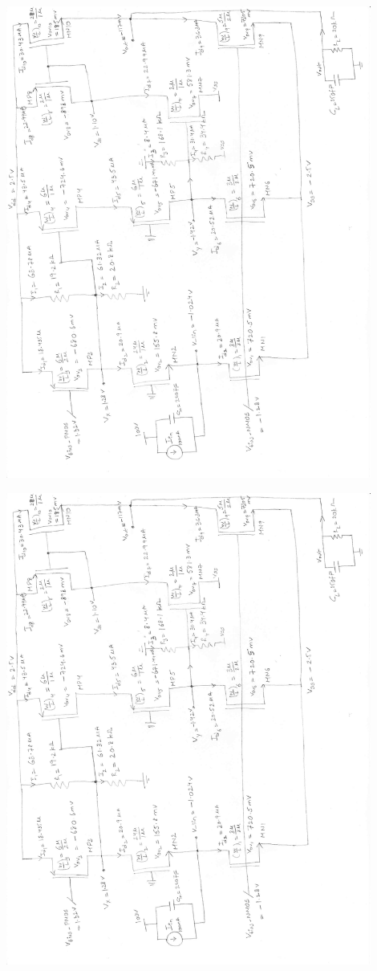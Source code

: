 \documentclass[12pt,a4paper]{article}
\begin{document}
{\centering
	\includegraphics[page=1, angle=270, width=0.9\textwidth]{project_schematic.pdf}\par
}

{\centering
	\includegraphics[page=2, angle=270, width=0.9\textwidth]{project_schematic.pdf}\par
}
\end{document}
